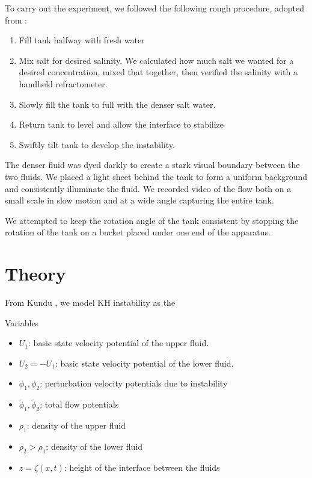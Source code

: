 \documentclass{article}
\begin{document}
To carry out the experiment, we followed the following rough procedure, adopted
from \cite{kh-instability-demo}:

\begin{enumerate}
    \item Fill tank halfway with fresh water
    \item Mix salt for desired salinity. We calculated how much salt we wanted
    for a desired concentration, mixed that together, then verified the salinity
    with a handheld refractometer.
    \item Slowly fill the tank to full with the denser salt water.
    \item Return tank to level and allow the interface to stabilize
    \item Swiftly tilt tank to develop the instability.
\end{enumerate}

The denser fluid was dyed darkly to create a stark visual boundary between the
two fluids. We placed a light sheet behind the tank to form a uniform background
and consistently illuminate the fluid. We recorded video of the flow both on a
small scale in slow motion and at a wide angle capturing the entire tank.

We attempted to keep the rotation angle of the tank consistent by stopping the
rotation of the tank on a bucket placed under one end of the apparatus.

\section{Theory}

From Kundu \cite{kundu}, we model KH instability as the %

Variables
\begin{itemize}
    \item \(U_1\): basic state velocity potential of the upper fluid.
    \item \(U_2 = -U_1\): basic state velocity potential of the lower fluid.
    \item \(\phi_1, \phi_2\): perturbation velocity potentials due to instability
    \item \(\tilde \phi_1, \tilde \phi_2\): total flow potentials
    \item \(\rho_1\): density of the upper fluid
    \item \(\rho_2 > \rho_1\): density of the lower fluid
    \item \(z = \zeta(x, t)\): height of the interface between the  fluids
\end{itemize}
\end{document}
